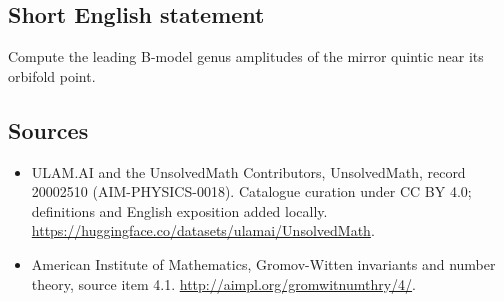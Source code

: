 \documentclass[11pt]{article}
\begin{document}
\subsection{Short English statement}
Compute the leading B-model genus amplitudes of the mirror quintic near its orbifold point.
\subsection{Sources}
\begin{itemize}
\item[\hypertarget{source:20002510:1}{S1}] ULAM.AI and the UnsolvedMath Contributors, UnsolvedMath, record 20002510 (AIM-PHYSICS-0018). Catalogue curation under CC BY 4.0; definitions and English exposition added locally.
\url{https://huggingface.co/datasets/ulamai/UnsolvedMath}.
\item[\hypertarget{source:20002510:2}{S2}] American Institute of Mathematics, Gromov-Witten invariants and number theory, source item 4.1.
\url{http://aimpl.org/gromwitnumthry/4/}.
\end{itemize}
\label{end:20002510}
\end{document}
